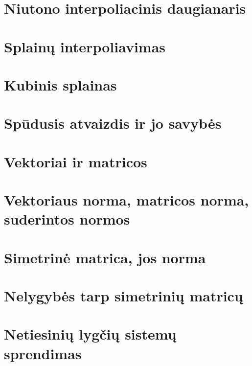 \section{Niutono interpoliacinis daugianaris}
\cite[168-169]{textbook}

\section{Splainų interpoliavimas}
\cite[170-173]{textbook}
\section{Kubinis splainas}
\cite[174-175]{textbook}

\section{Spūdusis atvaizdis ir jo savybės}
\cite[43-44]{textbook}
\section{Vektoriai ir matricos}
\section{Vektoriaus norma, matricos norma, suderintos normos}
\cite[43-44]{textbook}
\cite[104]{textbook}
\section{Simetrinė matrica, jos norma}
\section{Nelygybės tarp simetrinių matricų}
\cite[99]{textbook}
\section{Netiesinių lygčių sistemų sprendimas}
\cite[43-48]{textbook}

